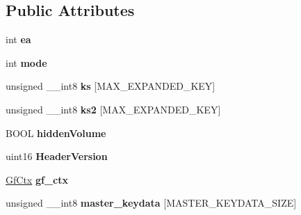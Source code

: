 \subsection*{Public Attributes}
\begin{DoxyCompactItemize}
\item 
\mbox{\label{struct_c_r_y_p_t_o___i_n_f_o__t_a769b0843f4a93380062b5a7b153e75eb}} 
int {\bfseries ea}
\item 
\mbox{\label{struct_c_r_y_p_t_o___i_n_f_o__t_a2ca1b8c5380da4446e4780d52f5c18ec}} 
int {\bfseries mode}
\item 
\mbox{\label{struct_c_r_y_p_t_o___i_n_f_o__t_a20f1184d88625a83511781bf6b27168f}} 
unsigned \+\_\+\+\_\+int8 {\bfseries ks} \mbox{[}M\+A\+X\+\_\+\+E\+X\+P\+A\+N\+D\+E\+D\+\_\+\+K\+EY\mbox{]}
\item 
\mbox{\label{struct_c_r_y_p_t_o___i_n_f_o__t_a5131a605efc7b27a6760dffbca062554}} 
unsigned \+\_\+\+\_\+int8 {\bfseries ks2} \mbox{[}M\+A\+X\+\_\+\+E\+X\+P\+A\+N\+D\+E\+D\+\_\+\+K\+EY\mbox{]}
\item 
\mbox{\label{struct_c_r_y_p_t_o___i_n_f_o__t_a05f73ded370dd50c5ea9ec4cc48c7f64}} 
B\+O\+OL {\bfseries hidden\+Volume}
\item 
\mbox{\label{struct_c_r_y_p_t_o___i_n_f_o__t_aa48f3c4c04449434d7e939458ce59ae6}} 
uint16 {\bfseries Header\+Version}
\item 
\mbox{\label{struct_c_r_y_p_t_o___i_n_f_o__t_ae4f03d05718d3085a43e4c3df803df40}} 
\hyperlink{struct_gf_ctx}{Gf\+Ctx} {\bfseries gf\+\_\+ctx}
\item 
\mbox{\label{struct_c_r_y_p_t_o___i_n_f_o__t_a3ed5d4caeac87ba4b4153851985660fc}} 
unsigned \+\_\+\+\_\+int8 {\bfseries master\+\_\+keydata} \mbox{[}M\+A\+S\+T\+E\+R\+\_\+\+K\+E\+Y\+D\+A\+T\+A\+\_\+\+S\+I\+ZE\mbox{]}
\item 
\mbox{\label{struct_c_r_y_p_t_o___i_n_f_o__t_ab3efb9f55ae931fa713c104170288372}} 

\end{DoxyCompactItemize}
